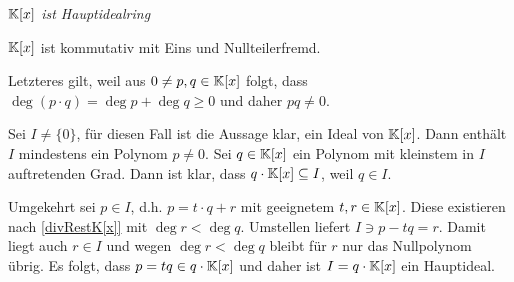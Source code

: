 
\begin{mysatz} \textit{$\mathbb{K}[x]$ ist  Hauptidealring} 

    $\mathbb{K}[x]$ ist kommutativ mit Eins und Nullteilerfremd.

    Letzteres gilt, weil aus $0 \neq p, q \in \mathbb{K}[x]$ folgt, dass $\deg (p \cdot q) = \deg p + \deg q \geq 0$ und daher $pq \neq 0$.

    Sei $I \neq \{ 0 \}$, für diesen Fall ist die Aussage klar, ein Ideal von $\mathbb{K}[x]$. Dann enthält $I$ mindestens ein Polynom $p \neq 0$. Sei $q \in \mathbb{K}[x]$ ein Polynom mit kleinstem in $I$ auftretenden Grad. Dann ist klar, dass $q \cdot \mathbb{K}[x] \subseteq I$, weil $q \in I$.

    Umgekehrt sei $p \in I$, d.h. $p = t \cdot q + r$ mit geeignetem $t, r \in \mathbb{K}[x]$. Diese existieren nach \ref{divRestK[x]} mit $\deg r < \deg q$. Umstellen liefert $I \ni p - tq = r$. Damit liegt auch $r \in I$ und wegen $\deg r < \deg q$ bleibt für $r$ nur das Nullpolynom übrig. Es folgt, dass $p = tq \in q \cdot \mathbb{K}[x]$ und daher ist $I = q \cdot \mathbb{K}[x]$ ein Hauptideal.
\end{mysatz}


